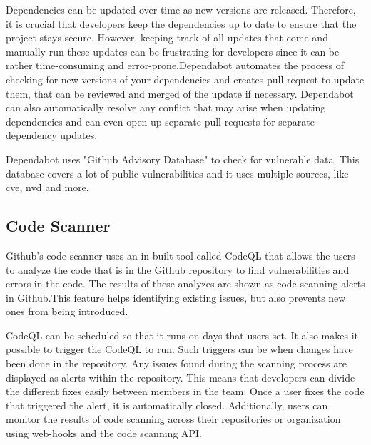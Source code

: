 Dependencies can be updated over time as new versions are released. Therefore, it is crucial that developers keep the dependencies up to date to ensure that the project stays secure. However, keeping track of all updates that come and manually run these updates can be frustrating for developers since it can be rather time-consuming and error-prone.Dependabot automates the process of checking for new versions of your dependencies and creates pull request to update them, that can be reviewed and merged of the update if necessary. 
Dependabot can also automatically resolve any conflict that may arise when updating dependencies and can even open up separate pull requests for separate dependency updates.  \cite{GithubDependabot2}

Dependabot uses "Github Advisory Database" to check for vulnerable data. This database covers a lot of public vulnerabilities and it uses multiple sources, like \acrlong{cve}, \acrlong{nvd} and more. \cite{GithubDependabot1}

\subsection{Code Scanner}
Github's code scanner uses an in-built tool called CodeQL that allows the users to analyze the code that is in the Github repository to find vulnerabilities and errors in the code. The results of these analyzes are shown as code scanning alerts in Github.This feature helps identifying existing issues, but also prevents new ones from being introduced. \cite{CodeQL}

CodeQL can be scheduled so that it runs on days that users set. It also makes it possible to trigger the CodeQL to run. Such triggers can be when changes have been done in the repository. 
 Any issues found during the scanning process are displayed as alerts within the repository. This means that developers can divide the different fixes easily between members in the team.  Once a user fixes the code that triggered the alert, it is automatically closed. Additionally, users can monitor the results of code scanning across their repositories or organization using web-hooks and the code scanning API. 
\cite{GithubCodeScanning}





